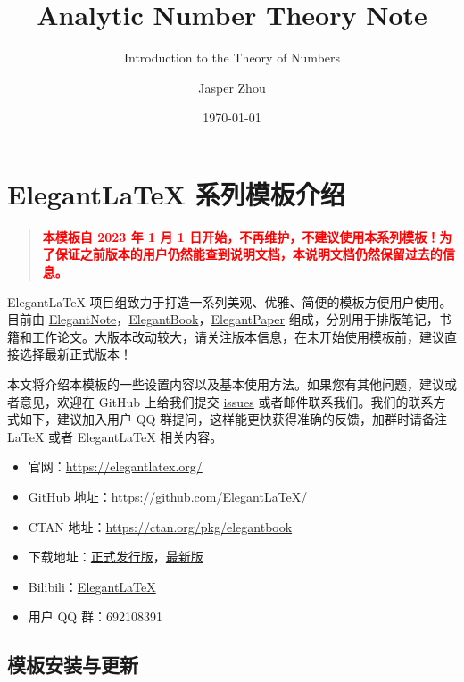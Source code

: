 \documentclass[lang=cn,newtx,10pt,scheme=chinese]{elegantbook}
\title{Analytic Number Theory Note}
\subtitle{Introduction to the Theory of Numbers}
\author{Jasper Zhou}
\date{\today}
\begin{document}
\maketitle
\frontmatter

\tableofcontents

\mainmatter

\chapter{Elegant\LaTeX{} 系列模板介绍}

\begin{quotation}
  \textbf{\textcolor{red}{本模板自 2023 年 1 月 1 日开始，不再维护，不建议使用本系列模板！为了保证之前版本的用户仍然能查到说明文档，本说明文档仍然保留过去的信息。}}
\end{quotation}

Elegant\LaTeX{} 项目组致力于打造一系列美观、优雅、简便的模板方便用户使用。目前由 \href{https://github.com/ElegantLaTeX/ElegantNote}{ElegantNote}，\href{https://github.com/ElegantLaTeX/ElegantBook}{ElegantBook}，\href{https://github.com/ElegantLaTeX/ElegantPaper}{ElegantPaper} 组成，分别用于排版笔记，书籍和工作论文。大版本改动较大，请关注版本信息，在未开始使用模板前，建议直接选择最新正式版本！


本文将介绍本模板的一些设置内容以及基本使用方法。如果您有其他问题，建议或者意见，欢迎在 GitHub 上给我们提交 \href{https://github.com/ElegantLaTeX/ElegantBook/issues}{issues} 或者邮件联系我们。我们的联系方式如下，建议加入用户 QQ 群提问，这样能更快获得准确的反馈，加群时请备注 \LaTeX{} 或者 Elegant\LaTeX{} 相关内容。
\begin{itemize}
  \item 官网：\href{https://elegantlatex.org/}{https://elegantlatex.org/}
  \item GitHub 地址：\href{https://github.com/ElegantLaTeX/}{https://github.com/ElegantLaTeX/}
  \item CTAN 地址：\href{https://ctan.org/pkg/elegantbook}{https://ctan.org/pkg/elegantbook}
  \item 下载地址：\href{https://github.com/ElegantLaTeX/ElegantBook/releases}{正式发行版}，\href{https://github.com/ElegantLaTeX/ElegantBook/archive/master.zip}{最新版}
  \item Bilibili：\href{https://space.bilibili.com/516479629}{ElegantLaTeX}
  \item 用户 QQ 群：692108391
\end{itemize}


\section{模板安装与更新}
\end{document}
